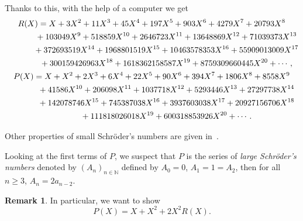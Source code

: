 \documentclass[pdftex]{sigma}
\numberwithin{equation}{section}
\theoremstyle{definition}
\newtheorem{Rq}[defi]{Remark}
\theoremstyle{plain}
\newcommand{\N}{\mathbb{N}}
\begin{document}
Thanks to this, with the help of a computer we get
\begin{gather*}
	R(X)=X+3X^2+11X^3+45X^4+197X^5+903X^6+4279X^7+20793 {{X}^{8}} \\
\hphantom{R(X)=}{} +103049 {{X}^{9}}+518859 {{X}^{10}} +2646723 {{X}^{11}}+13648869 {{X}^{12}}+71039373 {{X}^{13}} \\
\hphantom{R(X)=}{} +372693519 {{X}^{14}}+1968801519 {{X}^{15}}+10463578353 {{X}^{16}}+55909013009 {{X}^{17}} \\
\hphantom{R(X)=}{} +300159426963 {{X}^{18}}+1618362158587 {{X}^{19}}+8759309660445 {{X}^{20}}+\cdots, \\
	P(X)=X+{{X}^{2}}+2 {{X}^{3}}+6 {{X}^{4}}+22 {{X}^{5}}+90 {{X}^{6}}+394 {{X}^{7}}+1806 {{X}^{8}}+8558 {{X}^{9}}\\
\hphantom{P(X)=}{} +41586 {{X}^{10}}+206098 {{X}^{11}}+1037718 {{X}^{12}}+5293446 {{X}^{13}}+27297738 {{X}^{14}} \\
\hphantom{P(X)=}{} +142078746 {{X}^{15}} +745387038 {{X}^{16}}+3937603038 {{X}^{17}}+20927156706 {{X}^{18}}\\
\hphantom{P(X)=}{} +111818026018 {{X}^{19}}+600318853926 {{X}^{20}}+\cdots.
\end{gather*}

Other properties of small Schr\"oder's numbers are given in~\cite{OEIS}.

Looking at the first terms of $P$, we suspect that $P$ is the series of \emph{large Schr\"oder's numbers} denoted by $(A_n)_{n\in\N}$ defined by $A_0=0$, $A_1=1=A_2$, then for all $n\geq 3$, $A_{n}=2a_{n-2}$.

\begin{Rq}\label{Rq:series}
	In particular, we want to show
	\[
	P(X)=X+X^2+2X^2R(X).
	\]
\end{Rq}
\end{document}
